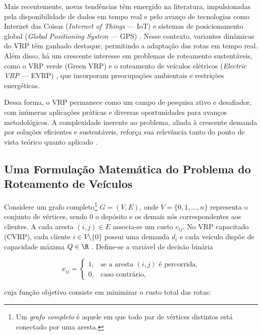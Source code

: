 Mais recentemente, novas tendências têm emergido na literatura, impulsionadas pela disponibilidade de dados em tempo real e pelo avanço de tecnologias como Internet das Coisas (\textit{Internet of Things} --- IoT) e sistemas de posicionamento global (\textit{Global Positioning System} --- GPS) \cite{ritzinger2016survey, boysen2018scheduling}. Nesse contexto, variantes dinâmicas do VRP têm ganhado destaque, permitindo a adaptação das rotas em tempo real. Além disso, há um crescente interesse em problemas de roteamento sustentáveis, como o VRP verde (Green VRP) \cite{lin2014survey} e o roteamento de veículos elétricos (\textit{Electric VRP} --- EVRP) \cite{schiffer2017electric}, que incorporam preocupações ambientais e restrições energéticas.

Dessa forma, o VRP permanece como um campo de pesquisa ativo e desafiador, com inúmeras aplicações práticas e diversas oportunidades para avanços metodológicos. A complexidade inerente ao problema, aliada à crescente demanda por soluções eficientes e sustentáveis, reforça sua relevância tanto do ponto de vista teórico quanto aplicado \cite{braekers2016vehicle, moghdani2021green}.

\subsection{Uma Formulação Matemática do Problema do Roteamento de Veículos}


Considere um grafo completo\footnote{Um \textit{grafo completo} é aquele em que todo par de vértices distintos está conectado por uma aresta.} $G = (V, E)$, onde $V = \{0, 1, \dots, n\}$ representa o conjunto de vértices, sendo $0$ o depósito e os demais nós correspondentes aos clientes. A cada aresta $(i,j) \in E$ associa-se um custo $c_{ij}$. No VRP capacitado (CVRP), cada cliente $i \in V \setminus \{0\}$ possui uma demanda $d_i$ e cada veículo dispõe de capacidade máxima $Q\in\R$ \cite{huang_solving_nodate}. Define-se a variável de decisão binária

\begin{equation}
    x_{ij} =
    \begin{cases}
        1, & \text{se a aresta } (i,j) \text{ é percorrida,} \\
        0, & \text{caso contrário,}
    \end{cases}
\end{equation}

\noindent cuja função objetivo consiste em minimizar o custo total das rotas:

